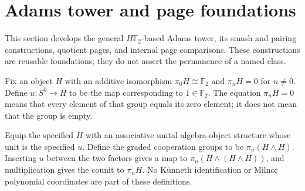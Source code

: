 \section{Adams tower and page foundations}
\label{chap:adams-tower-foundations}

This section develops the general $H\mathbb F_2$-based Adams tower, its
smash and pairing constructions, quotient pages, and internal page
comparisons. These constructions are reusable foundations; they do not
assert the permanence of a named class.

\begin{definition}
  \label{def:h6-em-object}
  \notready
  Fix an object $H$ with an additive isomorphism
  $\pi_0H\cong\mathbb F_2$ and $\pi_nH=0$ for $n\ne0$.
  Define $u:S^0\to H$ to be the map corresponding to $1\in\mathbb F_2$.
  The equation $\pi_nH=0$ means that every element of that group equals its
  zero element; it does not mean that the group is empty.
\end{definition}

\begin{definition}
  \label{def:h6-ring-cooperations}
  \leanok
  Equip the specified $H$ with an associative unital algebra-object
  structure whose unit is the specified $u$. Define the graded cooperation
  groups to be $\pi_n(H\wedge H)$. Inserting $u$ between the two factors
  gives a map to $\pi_n(H\wedge(H\wedge H))$, and multiplication gives
  the counit to $\pi_nH$. No K\"unneth identification or Milnor polynomial
  coordinates are part of these definitions.
\end{definition}

